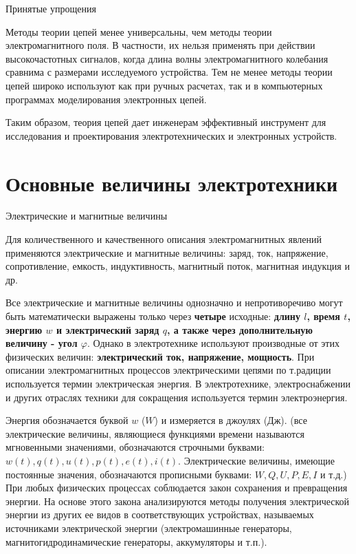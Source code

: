 \documentclass[12pt, pdf, hyperref={unicode},handout]{beamer}
\begin{document}
\begin{frame}{Принятые упрощения}
  \begin{block}

    \small{
Методы теории цепей менее универсальны, чем методы теории электромагнитного поля. В частности, их нельзя применять при действии высокочастотных сигналов, когда длина волны электромагнитного колебания сравнима с размерами исследуемого устройства. Тем не менее методы теории цепей широко используют как при ручных расчетах, так и в компьютерных программах моделирования электронных цепей.

Таким образом, теория цепей дает инженерам эффективный инструмент для исследования и проектирования электротехнических и электронных устройств. 
}

  \end{block}
  
\end{frame}

\section{Основные величины электротехники}
\begin{frame}{Электрические и магнитные величины}
  \begin{block}

    \small{
Для количественного и качественного описания электромагнитных явлений применяются электрические и магнитные величины: заряд, ток, напряжение, сопротивление, емкость, индуктивность, магнитный поток, магнитная индукция и др.

Все электрические и магнитные величины однозначно и непротиворечиво могут быть математически выражены только через \textbf{четыре} исходные: \textbf{длину $l$, время $t$, энергию $w$ и электрический заряд $q$, а также через дополнительную величину - угол $\varphi$}. Однако в электротехнике используют производные от этих физических величин: \textbf{электрический ток, напряжение, мощность}.
При описании электромагнитных процессов электрическими цепями по т.радиции используется термин электрическая энергия. В электротехнике, электроснабжении и других отраслях техники для сокращения используется термин электроэнергия.

Энергия обозначается буквой $w$ ($W$) и измеряется в джоулях (Дж). (все электрические величины, являющиеся функциями времени называются мгновенными значениями, обозначаются строчными буквами: $w(t), q(t), u(t), p(t), e(t), i(t)$. Электрические величины, имеющие постоянные значения, обозначаются прописными буквами: $W, Q, U, P, E, I$ и т.д.) При любых физических процессах соблюдается закон сохранения и превращения энергии. На основе этого закона анализируются методы получения электрической энергии из других ее видов в соответствующих устройствах, называемых источниками электрической энергии (электромашинные генераторы, магнитогидродинамические генераторы, аккумуляторы и т.п.).

}

  \end{block}
  
\end{frame}
\end{document}
